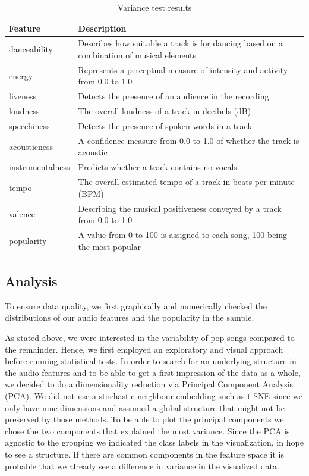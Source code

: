 \documentclass{article}
\begin{document}
\begin{table}[h!]
  \caption{Variance test results}
  \label{tab:var}
  \centering
  \begin{tabular}{ll}
    \toprule
    Feature     & Description\\
    \midrule
	danceability        	& Describes how suitable a track is for dancing based on a combination of musical elements   \\
	energy              	&  Represents a perceptual measure of intensity and activity from 0.0 to 1.0\\
	liveness            	&  Detects the presence of an audience in the recording\\
	loudness            	&  The overall loudness of a track in decibels (dB)\\
	speechiness         	&  Detects the presence of spoken words in a track\\
	acousticness        	& A confidence measure from 0.0 to 1.0 of whether the track is acoustic	\\
	instrumentalness    	&	Predicts whether a track contains no vocals. \\
	tempo               	&  The overall estimated tempo of a track in beats per minute (BPM)\\
	valence             	& Describing the musical positiveness conveyed by a track from 0.0 to 1.0\\
	\midrule
	popularity           &  A value from 0 to 100 is assigned to each song, 100 being the most popular\\
    \bottomrule
  \end{tabular}
\end{table}


\subsection{Analysis}
To ensure data quality, we first graphically and numerically checked the distributions of our audio features and the popularity in the sample.

As stated above, we were interested in the variability of pop songs compared to the remainder. Hence, we first employed an exploratory and visual approach before running statistical tests. In order to search for an underlying structure in the audio features and to be able to get a first impression of the data as a whole, we decided to do a dimensionality reduction via Principal Component Analysis (PCA). We did not use a stochastic neighbour embedding such as t-SNE since we only have nine dimensions and assumed a global structure that might not be preserved by those methods. To be able to plot the principal components we chose the two components that explained the most variance. Since the PCA is agnostic to the grouping we indicated the class labels in the visualization, in hope to see a structure. If there are common components in the feature space it is probable that we already see a difference in variance in the visualized data.
\end{document}

